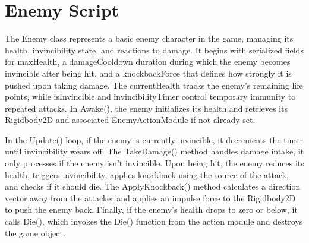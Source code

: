 \documentclass[12pt,oneside,openright,a4paper]{cpe-english-project}
\begin{document}
\section{Enemy Script}
The Enemy class represents a basic enemy character in the game, managing its health, invincibility state, and reactions to damage. It begins with serialized fields for maxHealth, a damageCooldown duration during which the enemy becomes invincible after being hit, and a knockbackForce that defines how strongly it is pushed upon taking damage. The currentHealth tracks the enemy's remaining life points, while isInvincible and invincibilityTimer control temporary immunity to repeated attacks. In Awake(), the enemy initializes its health and retrieves its Rigidbody2D and associated EnemyActionModule if not already set.\par
In the Update() loop, if the enemy is currently invincible, it decrements the timer until invincibility wears off. The TakeDamage() method handles damage intake, it only processes if the enemy isn't invincible. Upon being hit, the enemy reduces its health, triggers invincibility, applies knockback using the source of the attack, and checks if it should die. The ApplyKnockback() method calculates a direction vector away from the attacker and applies an impulse force to the Rigidbody2D to push the enemy back. Finally, if the enemy’s health drops to zero or below, it calls Die(), which invokes the Die() function from the action module and destroys the game object.\par
\newpage
\end{document}
